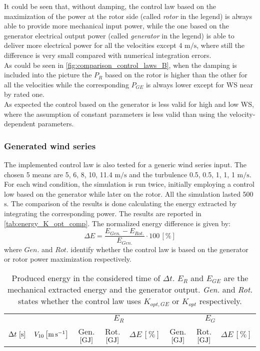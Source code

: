 It could be seen that, without damping, the control law based on the maximization of the power at the rotor side (called \textit{rotor} in the legend) is always able to provide more mechanical input power, while the one based on the generator electrical output power (called \textit{generator} in the legend) is able to deliver more electrical power for all the velocities except 4 $\si{\meter\per\second}$, where still the difference is very small compared with numerical integration errors.  \\
As could be seen in \autoref{fig:comparison_control_laws_B}, when the damping is included into the picture the $P_R$ based on the rotor is higher than the other for all the velocities while the corresponding $P_{GE}$ is always lower except for WS near by rated one.\\
As expected the control based on the generator is less valid for high and low WS, where the assumption of constant parameters is less valid than using the velocity-dependent parameters. 

\subsubsection{Generated wind series}
The implemented control law is also tested for a generic wind series input. The chosen 5 means are 5, 6, 8, 10, 11.4 $\si{\meter\per\second}$ and the turbulence 0.5, 0.5, 1, 1, 1 $\si{\meter\per\second}$. For each wind condition, the simulation is run twice, initially employing a control low based on the generator while later on the rotor. All the simulation lasted 500 $\si{\second}$. The comparison of the results is done calculating the energy extracted by integrating the corresponding power. The results are reported in \autoref{tab:energy_K_opt_comp}. The normalized energy difference is given by:
\begin{equation}
  \Delta E = \frac{E_{Gen.} - E_{Rot.}}{E_{Gen.}}\cdot 100 \, \left[\%\right]
\end{equation}
where $Gen.$ and $Rot.$ identify whether the control law is based on the generator or rotor power maximization respectively.
\begin{table}[!htbp]
  \centering
  \caption{Produced energy in the considered time of $\Delta t$. $E_R$ and $E_{GE}$ are the mechanical extracted energy and the generator output. \textit{Gen.} and \textit{Rot.} states whether the control law uses $K_{opt,GE}$ or $K_{opt}$ respectively. }
  \begin{tabular}{cc|ccc|ccc}
    \toprule
    & & \multicolumn{3}{c|}{$E_R$} & \multicolumn{3}{c}{$E_G$} \\
     $\Delta t \,\left[\si{\second}\right]$ &  $V_{10} \left[\si{\meter\per\second}\right]$ & Gen. $\left[\si{\giga\joule}\right]$ & Rot. $\left[\si{\giga\joule}\right]$ & $\Delta E \, \left[\%\right]$ & Gen. $\left[\si{\giga\joule}\right]$ & Rot. $\left[\si{\giga\joule}\right]$ & $\Delta E \, \left[\%\right]$ \\ \midrule
    
  \end{tabular}
  \label{tab:energy_K_opt_comp}
\end{table}

